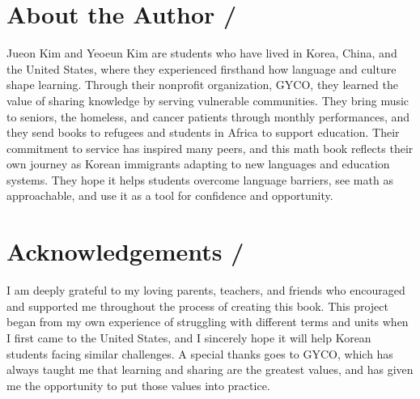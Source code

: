 \newpage
\section*{About the Author / }
Jueon Kim and Yeoeun Kim are students who have lived in Korea, 
China, and the United States, where they experienced firsthand 
how language and culture shape learning. Through their nonprofit 
organization, GYCO, they learned the value of sharing knowledge 
by serving vulnerable communities. They bring music to seniors, 
the homeless, and cancer patients through monthly performances, 
and they send books to refugees and students in Africa to 
support education.
Their commitment to service has inspired many peers, and this 
math book reflects their own journey as Korean immigrants 
adapting to new languages and education systems. They hope 
it helps students overcome language barriers, see math as 
approachable, and use it as a tool for confidence and opportunity.
\subsection*{}
\section*{Acknowledgements / }
I am deeply grateful to my loving parents, teachers, and 
friends who encouraged and supported me throughout the 
process of creating this book. This project began from 
my own experience of struggling with different terms and 
units when I first came to the United States, and I sincerely 
hope it will help Korean students facing similar challenges.
A special thanks goes to GYCO, which has always taught me 
that learning and sharing are the greatest values, and has 
given me the opportunity to put those values into practice.
